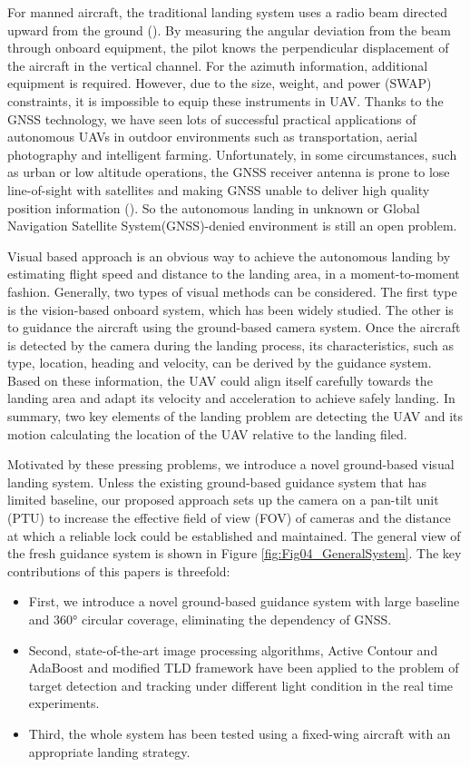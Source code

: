 For manned aircraft, the traditional landing system uses a radio beam directed upward from the ground (\cite{mclean1990automatic, stevens2003aircraft}). By measuring the angular deviation from the beam through onboard equipment, the pilot knows the perpendicular displacement of the aircraft in the vertical channel. For the azimuth information, additional equipment is required. However, due to the size, weight, and power (SWAP) constraints, it is impossible to equip these instruments in UAV. Thanks to the GNSS technology, we have seen lots of successful practical applications of autonomous UAVs in outdoor environments such as transportation, aerial photography and intelligent farming. Unfortunately, in some circumstances, such as urban or low altitude operations, the GNSS receiver antenna is prone to lose line-of-sight with satellites and making GNSS unable to deliver high quality position information (\cite{farrell1998gps}). So the autonomous landing in unknown or Global Navigation Satellite System(GNSS)-denied environment is still an open problem. 

Visual based approach is an obvious way to achieve the autonomous landing by estimating flight speed and distance to the landing area, in a moment-to-moment fashion. Generally, two types of visual methods can be considered. The first type is the vision-based onboard system, which has been widely studied. The other is to guidance the aircraft using the ground-based camera system. Once the aircraft is detected by the camera during the landing process, its characteristics, such as type, location, heading and velocity, can be derived by the guidance system. Based on these information, the UAV could align itself carefully towards the landing area and adapt its velocity and acceleration to achieve safely landing. In summary, two key elements of the landing problem are detecting the UAV and its motion calculating the location of the UAV relative to the landing filed. 

Motivated by these pressing problems, we introduce a novel ground-based visual landing system. Unless the existing ground-based guidance system that has limited baseline, our proposed approach sets up the camera on a pan-tilt unit (PTU) to increase the effective field of view (FOV) of cameras and the distance at which a reliable lock could be established and maintained. The general view of the fresh guidance system is shown in Figure \ref{fig:Fig04_GeneralSystem}. The key contributions of this papers is threefold:
\begin{itemize}
	\item First, we introduce a novel ground-based guidance system with large baseline and 360° circular coverage, eliminating the dependency of GNSS.
	\item Second, state-of-the-art image processing algorithms, Active Contour and AdaBoost and modified TLD framework have been applied to the problem of target detection and tracking under different light condition in the real time experiments.
	\item Third, the whole system has been tested using a fixed-wing aircraft with an appropriate landing strategy.
\end{itemize}



